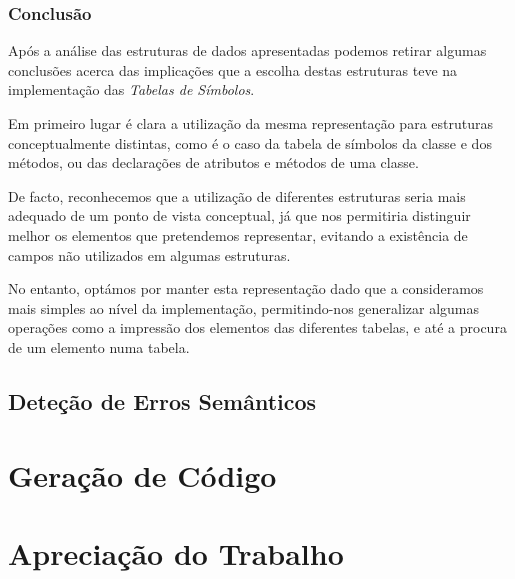 \documentclass[11pt,a4paper]{article}
\begin{document}
	\subsubsection{Conclusão}
	
	Após a análise das estruturas de dados apresentadas podemos retirar algumas conclusões acerca das implicações que a escolha destas estruturas teve na implementação das \emph{Tabelas de Símbolos}.
	
	Em primeiro lugar é clara a utilização da mesma representação para estruturas conceptualmente distintas, como é o caso da tabela de símbolos da classe e dos métodos, ou das declarações de atributos e métodos de uma classe.
	
	De facto, reconhecemos que a utilização de diferentes estruturas seria mais adequado de um ponto de vista conceptual, já que nos permitiria distinguir melhor os elementos que pretendemos representar, evitando a existência de campos não utilizados em algumas estruturas.
	
	No entanto, optámos por manter esta representação dado que a consideramos mais simples ao nível da implementação, permitindo-nos generalizar algumas operações como a impressão dos elementos das diferentes tabelas, e até a procura de um elemento numa tabela.
	
	\pagebreak
	
	\subsection{Deteção de Erros Semânticos}
	
	\pagebreak
	
\section{Geração de Código}

\pagebreak

\section{Apreciação do Trabalho}
\end{document}
